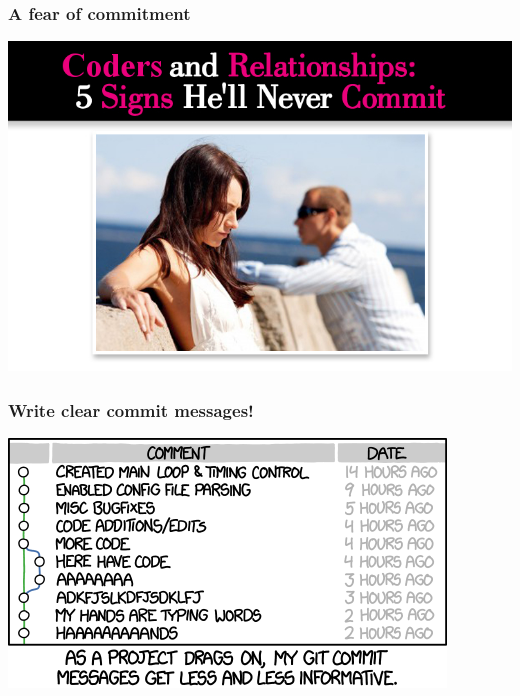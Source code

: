 \documentclass{beamer}
\begin{document}
\begin{frame}[fragile]
\frametitle{A fear of commitment}
\includegraphics[width=\textwidth]{no_commit.jpg}
\end{frame}

\begin{frame}[fragile]
\frametitle{Write clear commit messages!}
\includegraphics[width=\textwidth]{git_commit.png}
\end{frame}
\end{document}
